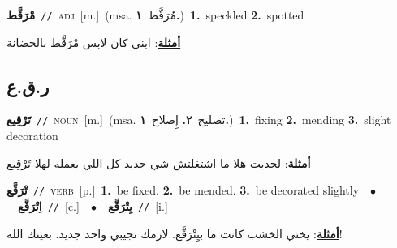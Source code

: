 \documentclass[10pt,a4paper,twoside]{article} %
\begin{document}
\begin{multicols}{2}
{\setlength\topsep{0pt}\textbf{\foreignlanguage{arabic}{مْرَقَّط}}\ {\color{gray}\texttt{//}\color{black}}\ \textsc{adj}\ [m.]\ \color{gray}(msa. \foreignlanguage{arabic}{مُرَقَّط}~\foreignlanguage{arabic}{\textbf{١.}})\color{black}\ \textbf{1.}~speckled  \textbf{2.}~spotted\  \begin{flushright}\color{gray}\foreignlanguage{arabic}{\textbf{\underline{\foreignlanguage{arabic}{أمثلة}}}: ابني كان لابس مْرَقَّط بالحضانة}\end{flushright}\color{black}} \vspace{2mm}

\vspace{-3mm}
\subsection*{\color{blue}\foreignlanguage{arabic}{ر.ق.ع}\color{blue}{}} 

{\setlength\topsep{0pt}\textbf{\foreignlanguage{arabic}{تَرْقِيع}}\ {\color{gray}\texttt{//}\color{black}}\ \textsc{noun}\ [m.]\ \color{gray}(msa. \foreignlanguage{arabic}{تصليح}~\foreignlanguage{arabic}{\textbf{٢.}}  \foreignlanguage{arabic}{إِصلاح}~\foreignlanguage{arabic}{\textbf{١.}})\color{black}\ \textbf{1.}~fixing  \textbf{2.}~mending  \textbf{3.}~slight decoration\  \begin{flushright}\color{gray}\foreignlanguage{arabic}{\textbf{\underline{\foreignlanguage{arabic}{أمثلة}}}: لحديت هلا ما اشتغلتش شي جديد كل اللي بعمله لهلا تَرْقِيع}\end{flushright}\color{black}} \vspace{2mm}

{\setlength\topsep{0pt}\textbf{\foreignlanguage{arabic}{تْرَقَّع}}\ {\color{gray}\texttt{//}\color{black}}\ \textsc{verb}\ [p.]\ \textbf{1.}~be fixed.  \textbf{2.}~be mended.  \textbf{3.}~be decorated slightly\ \ $\bullet$\ \ \setlength\topsep{0pt}\textbf{\foreignlanguage{arabic}{اِتْرَقَّع}}\ {\color{gray}\texttt{//}\color{black}}\ [c.]\ \ $\bullet$\ \ \setlength\topsep{0pt}\textbf{\foreignlanguage{arabic}{يِتْرَقَّع}}\ {\color{gray}\texttt{//}\color{black}}\ [i.]\  \begin{flushright}\color{gray}\foreignlanguage{arabic}{\textbf{\underline{\foreignlanguage{arabic}{أمثلة}}}: يختي الخشب كاتت ما بيِتْرَقَّع. لازمك تجيبي واحد جديد. بعينك الله!}\end{flushright}\color{black}} \vspace{2mm}


\end{multicols}
\end{document}
